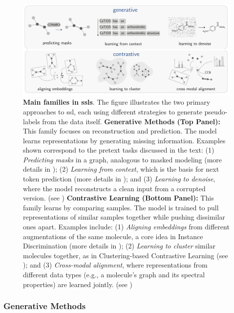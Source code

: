 \begin{figure}[H]
    \centering
    \includegraphics[width=1\textwidth]{figures/rescaled_figures/chemrev_figure5.pdf}
    \caption{\textbf{Main families in \glspl{ssl}}. The figure illustrates the two primary approaches to \gls{ssl}, each using different strategies to generate pseudo-labels from the data itself.
    \textbf{Generative Methods (Top Panel):} This family focuses on reconstruction and prediction. The model learns representations by generating missing information. Examples shown correspond to the pretext tasks discussed in the text: (1) \textit{Predicting masks} in a graph, analogous to masked modeling (more details in ); (2) \textit{Learning from context}, which is the basis for next token prediction (more details in ); and (3) \textit{Learning to denoise}, where the model reconstructs a clean input from a corrupted version. (see )
    \textbf{Contrastive Learning (Bottom Panel):} This family learns by comparing samples. The model is trained to pull representations of similar samples together while pushing dissimilar ones apart. Examples include: (1) \textit{Aligning embeddings} from different augmentations of the same molecule, a core idea in Instance Discrimination (more details in ); (2) \textit{Learning to cluster} similar molecules together, as in Clustering-based Contrastive Learning (see ); and (3) \textit{Cross-modal alignment}, where representations from different data types (e.g., a molecule's graph and its spectral properties) are learned jointly. (see  )}
    \label{fig:types_ssl}
\end{figure}

\subsubsection{Generative Methods}

